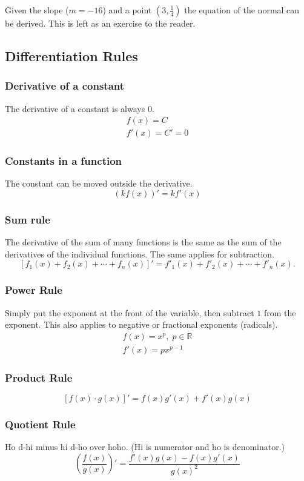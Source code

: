 \documentclass[12pt]{article}
\begin{document}
Given the slope ($m = -16$) and a point $\left( 3, \frac{1}{4} \right)$ the equation of the normal can be derived. This is left as an exercise to the reader.

\subsection{Differentiation Rules}
\subsubsection{Derivative of a constant}
\noindent The derivative of a constant is always $0$.
\begin{gather*}
    f(x) = C \\
    f'(x) = C' = 0
\end{gather*}

\subsubsection{Constants in a function}
\noindent The constant can be moved outside the derivative.
\[ \left( k f(x) \right)' = k f'(x) \]

\subsubsection{Sum rule}
The derivative of the sum of many functions is the same as the sum of the derivatives of the individual functions. The same applies for subtraction.
\[ \left[ f_1(x) + f_2(x) + \cdots + f_n(x) \right]' = f'_1(x) + f'_2(x) + \cdots + f'_n(x). \]

\subsubsection{Power Rule}
Simply put the exponent at the front of the variable, then subtract $1$ from the exponent. This also applies to negative or fractional exponents (radicals).
\begin{gather*}
    f(x) = x^p, \; p \in \mathbb{R} \\
    f'(x) = px^{p-1}
\end{gather*}

\subsubsection{Product Rule}
\[ \left[ f(x) \cdot g(x) \right]' = f(x)g'(x) + f'(x)g(x) \]

\subsubsection{Quotient Rule}
\noindent Ho d-hi minus hi d-ho over hoho. (Hi is numerator and ho is denominator.)
\[ \left( \frac{f(x)}{g(x)} \right)' = \frac{f'(x)g(x) - f(x)g'(x)}{g(x)^2} \]
\end{document}
